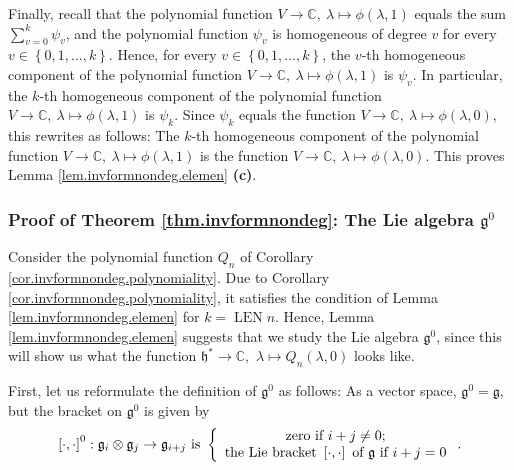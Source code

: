 \documentclass[etingof-lie.tex]{subfiles}
\begin{document}
Finally, recall that the polynomial function $V\rightarrow\mathbb{C}%
,\ \lambda\mapsto\phi\left(  \lambda,1\right)  $ equals the sum $\sum
\limits_{v=0}^{k}\psi_{v}$, and the polynomial function $\psi_{v}$ is
homogeneous of degree $v$ for every $v\in\left\{  0,1,...,k\right\}  $. Hence,
for every $v\in\left\{  0,1,...,k\right\}  $, the $v$-th homogeneous component
of the polynomial function $V\rightarrow\mathbb{C},\ \lambda\mapsto\phi\left(
\lambda,1\right)  $ is $\psi_{v}$. In particular, the $k$-th homogeneous
component of the polynomial function $V\rightarrow\mathbb{C},\ \lambda
\mapsto\phi\left(  \lambda,1\right)  $ is $\psi_{k}$. Since $\psi_{k}$ equals
the function $V\rightarrow\mathbb{C},\ \lambda\mapsto\phi\left(
\lambda,0\right)  $, this rewrites as follows: The $k$-th homogeneous
component of the polynomial function $V\rightarrow\mathbb{C},\ \lambda
\mapsto\phi\left(  \lambda,1\right)  $ is the function $V\rightarrow
\mathbb{C},\ \lambda\mapsto\phi\left(  \lambda,0\right)  $. This proves Lemma
\ref{lem.invformnondeg.elemen} \textbf{(c)}.

\subsubsection{Proof of Theorem \ref{thm.invformnondeg}: The Lie algebra
\texorpdfstring{$\mathfrak{g}^{0}$}{g superscript 0}}

Consider the polynomial function $Q_{n}$ of Corollary
\ref{cor.invformnondeg.polynomiality}. Due to Corollary
\ref{cor.invformnondeg.polynomiality}, it satisfies the condition of Lemma
\ref{lem.invformnondeg.elemen} for $k=\operatorname*{LEN}n$. Hence, Lemma
\ref{lem.invformnondeg.elemen} suggests that we study the Lie algebra
$\mathfrak{g}^{0}$, since this will show us what the function $\mathfrak{h}%
^{\ast}\rightarrow\mathbb{C},$ $\lambda\mapsto Q_{n}\left(  \lambda,0\right)
$ looks like.

First, let us reformulate the definition of $\mathfrak{g}^{0}$ as follows: As
a vector space, $\mathfrak{g}^{0}=\mathfrak{g}$, but the bracket on
$\mathfrak{g}^{0}$ is given by%
\begin{equation}
\left[  \cdot,\cdot\right]  ^{0}:\mathfrak{g}_{i}\otimes\mathfrak{g}%
_{j}\rightarrow\mathfrak{g}_{i+j}\text{ }\text{is }\left\{
\begin{array}
[c]{c}%
\text{zero if }i+j\neq0\text{;}\\
\text{the Lie bracket }\left[  \cdot,\cdot\right]  \text{ of }\mathfrak{g}%
\text{ if }i+j=0
\end{array}
\right.  . \label{prop.det.US.pf.-1}%
\end{equation}
\end{document}
